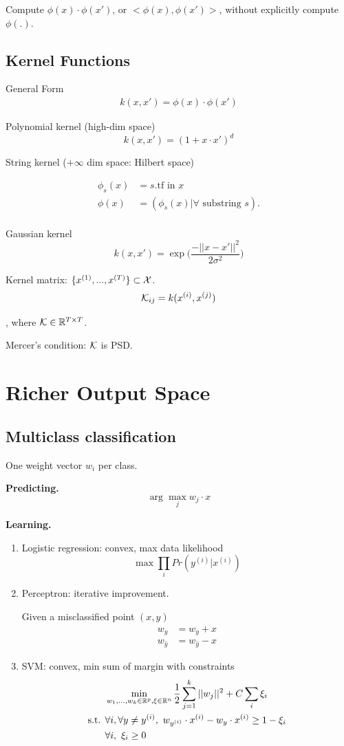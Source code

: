 \documentclass[a4paper]{report}
\begin{document}
Compute $\phi(x)\cdot \phi(x')$, or $<\phi(x), \phi(x')>$, without explicitly compute $\phi(.)$. 

\section{Kernel Functions}
General Form 
\begin{align*}
k(x, x') = \phi(x)\cdot\phi(x')
\end{align*}

Polynomial kernel (high-dim space)
$$
k(x, x')=(1+x\cdot x')^d
$$

String kernel ($+\infty$ dim space: Hilbert space)

\begin{align*}
\phi_s(x)&= s.\text{tf in } x\\
\phi(x) &= (\phi_s(x)|\forall \text{ substring } s). \\
\end{align*}

Gaussian kernel
$$
k(x, x') = \exp\Big(\frac{-||x-x'||^2}{2\sigma^2}\Big)
$$


Kernel matrix: $\{x^{(1)},...,x^{(T)}\}\subset \mathcal{X}$. 
$$
\mathcal{K}_{ij} = k(x^{(i)}, x^{(j)}) 
$$

, where $\mathcal{K}\in \mathbb{R}^{T\times T}$.

Mercer's condition: $\mathcal{K}$ is PSD.

\chapter{Richer Output Space} 
\section{Multiclass classification}
One weight vector $w_i$ per class. 

\textbf{Predicting.} 
$$
\arg\max_j w_j \cdot x
$$

\textbf{Learning.}
\begin{enumerate}
\item Logistic regression: convex, max data likelihood
$$
\max \prod_i Pr(y^{(i)}|x^{(i)})
$$
\item Perceptron: iterative improvement.

Given a misclassified point $(x, y)$
\begin{align*}
w_y &= w_y + x \\
w_{\hat y} &= w_{\hat y} - x
\end{align*}
\item SVM: convex, min sum of margin with constraints
\begin{align*}
&\min_{w_1, ..., w_k \in \mathbb{R}^p, \xi\in \mathbb{R}^n} \frac{1}{2}\sum_{j=1}^k ||w_j||^2+C\sum_i \xi_i \\
\text{s.t. } &\forall i, \forall y \neq y^{(i)},~ w_{y^{(i)}}\cdot x^{(i)} - w_y \cdot x^{(i)} \geq 1-\xi_i \\
& \forall i,~ \xi_i\geq0
\end{align*}
\end{enumerate}
\end{document}
